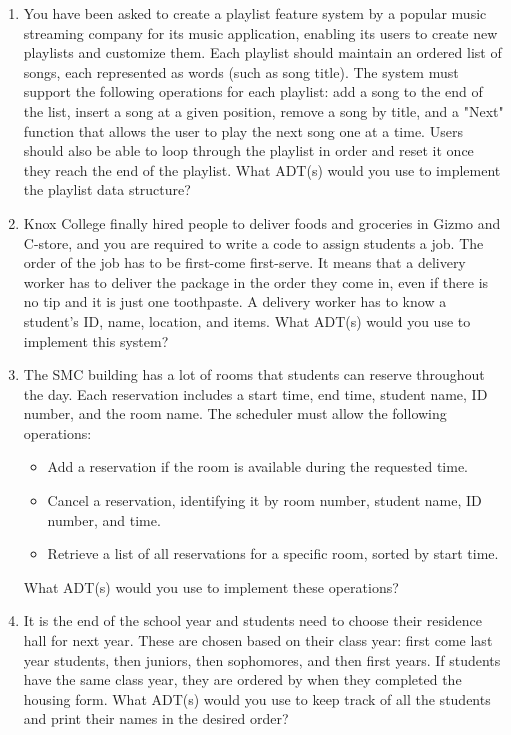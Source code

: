 \documentclass{article}
\begin{document}
\begin{enumerate}
\item 
  You have been asked to create a playlist feature system by a popular
  music streaming company for its music application, enabling its
  users to create new playlists and customize them. Each playlist
  should maintain an ordered list of songs, each represented as words
  (such as song title). The system must support the following
  operations for each playlist: add a song to the end of the list,
  insert a song at a given position, remove a song by title, and a
  "Next" function that allows the user to play the next song one at a
  time. Users should also be able to loop through the playlist in
  order and reset it once they reach the end of the playlist.
  What ADT(s) would you use to implement the playlist data structure?

\item 
  Knox College finally hired people to deliver foods and groceries in
  Gizmo and C-store, and you are required to write a code to assign
  students a job. The order of the job has to be first-come
  first-serve. It means that a delivery worker has to deliver the
  package in the order they come in, even if there is no tip and it is
  just one toothpaste. A delivery worker has to know a student’s ID,
  name, location, and items.
  What ADT(s) would you use to implement this system?
  
\item 
  The SMC building has a lot of rooms that students can reserve throughout the day.
Each reservation includes a start time, end time, student name, ID number, and the
room name. The scheduler must allow the following operations:
\begin{itemize}
\item Add a reservation if the room is available during the requested time.
\item Cancel a reservation, identifying it by room number, student name, ID number, and time.
\item Retrieve a list of all reservations for a specific room, sorted by
start time.
\end{itemize}
What ADT(s) would you use to implement these operations?

\item 
  It is the end of the school year and students need to choose their
  residence hall for next year.
These are chosen based on their class year: first come last year
students, then juniors, then sophomores, and then first years.
If students have the same class year, they are ordered by when they
completed the housing form.
What ADT(s) would you use to keep track of all the students and print
their names in the desired order?


\end{enumerate}
\end{document}
